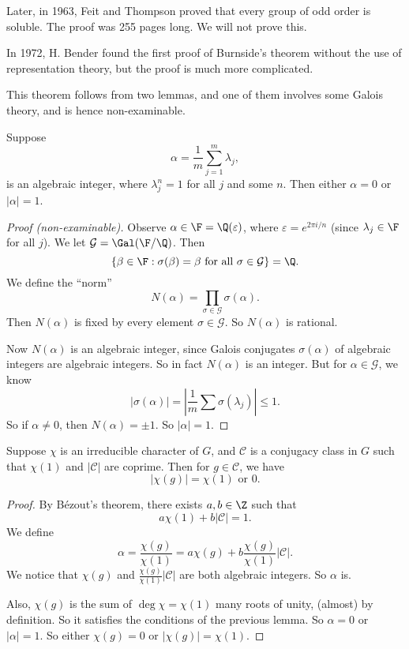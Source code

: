 \documentclass[a4paper]{article}
\begin{document}
Later, in 1963, Feit and Thompson proved that every group of odd order is soluble. The proof was 255 pages long. We will not prove this.

In 1972, H. Bender found the first proof of Burnside's theorem without the use of representation theory, but the proof is much more complicated.

This theorem follows from two lemmas, and one of them involves some Galois theory, and is hence non-examinable.
\begin{lemma}
  Suppose
  \[
    \alpha = \frac{1}{m} \sum_{j = 1}^m \lambda_j,
  \]
  is an algebraic integer, where $\lambda_j^n = 1$ for all $j$ and some $n$. Then either $\alpha = 0$ or $|\alpha| = 1$.
\end{lemma}

\begin{proof}[Proof (non-examinable)]
  Observe $\alpha \in \F = \Q(\varepsilon)$, where $\varepsilon = e^{2\pi i/n}$ (since $\lambda_j \in \F$ for all $j$). We let $\mathcal{G} = \Gal(\F/\Q)$. Then
  \[
    \{\beta \in \F: \sigma(\beta) = \beta \text{ for all }\sigma \in \mathcal{G}\} = \Q.
  \]
  We define the ``norm''
  \[
    N(\alpha) = \prod_{\sigma \in \mathcal{G}} \sigma(\alpha).
  \]
  Then $N(\alpha)$ is fixed by every element $\sigma \in \mathcal{G}$. So $N(\alpha)$ is rational.

  Now $N(\alpha)$ is an algebraic integer, since Galois conjugates $\sigma(\alpha)$ of algebraic integers are algebraic integers. So in fact $N(\alpha)$ is an integer. But for $\alpha \in \mathcal{G}$, we know
  \[
    |\sigma(\alpha)| = \left|\frac{1}{m} \sum \sigma(\lambda_j)\right| \leq 1.
  \]
  So if $\alpha \not= 0$, then $N(\alpha) = \pm 1$. So $|\alpha| = 1$.
\end{proof}

\begin{lemma}
  Suppose $\chi$ is an irreducible character of $G$, and $\mathcal{C}$ is a conjugacy class in $G$ such that $\chi(1)$ and $|\mathcal{C}|$ are coprime. Then for $g \in \mathcal{C}$, we have
  \[
    |\chi(g)| = \chi(1) \text{ or }0.
  \]
\end{lemma}

\begin{proof}
  By B\'ezout's theorem, there exists $a, b \in \Z$ such that
  \[
    a \chi(1) + b |\mathcal{C}| = 1.
  \]
  We define
  \[
    \alpha = \frac{\chi(g)}{\chi(1)} = a\chi(g) + b\frac{\chi(g)}{\chi(1)} |\mathcal{C}|.
  \]
  We notice that $\chi(g)$ and $\frac{\chi(g)}{\chi(1)} |\mathcal{C}|$ are both algebraic integers. So $\alpha$ is.

  Also, $\chi(g)$ is the sum of $\deg \chi = \chi(1)$ many roots of unity, (almost) by definition. So it satisfies the conditions of the previous lemma. So $\alpha = 0$ or $|\alpha| = 1$. So either $\chi(g) = 0$ or $|\chi(g)| = \chi(1)$.
\end{proof}
\end{document}
